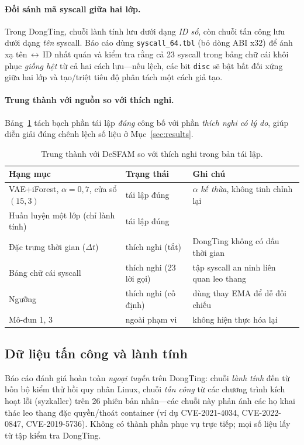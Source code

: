 \paragraph{Đối sánh mã syscall giữa hai lớp.} Trong DongTing, chuỗi lành tính lưu
dưới dạng \emph{ID số}, còn chuỗi tấn công lưu dưới dạng \emph{tên} syscall. Báo cáo
dùng \texttt{syscall\_64.tbl} (bỏ dòng ABI x32) để ánh xạ tên\,$\leftrightarrow$\,ID
nhất quán và kiểm tra rằng cả 23 syscall trong bảng chữ cái khôi phục \emph{giống
hệt} từ cả hai cách lưu---nếu lệch, các bit \texttt{disc} sẽ bật bất đối xứng giữa
hai lớp và tạo/triệt tiêu độ phân tách một cách giả tạo.

\paragraph{Trung thành với nguồn so với thích nghi.} Bảng~\ref{tab:fidelity} tách
bạch phần tái lập \emph{đúng} công bố với phần \emph{thích nghi có lý do}, giúp diễn
giải đúng chênh lệch số liệu ở Mục~\ref{sec:results}.

\begin{table}[htbp]
  \centering
  \caption{Trung thành với DeSFAM so với thích nghi trong bản tái lập.}
  \label{tab:fidelity}
  \small
  \begin{tabularx}{\linewidth}{@{}>{\raggedright\arraybackslash}p{4.6cm} l >{\raggedright\arraybackslash}X@{}}
    \toprule
    \textbf{Hạng mục} & \textbf{Trạng thái} & \textbf{Ghi chú} \\
    \midrule
    VAE+iForest, $\alpha=0{,}7$, cửa sổ $(15,3)$ & tái lập đúng & $\alpha$ \emph{kế thừa}, không tinh chỉnh lại \\
    Huấn luyện một lớp (chỉ lành tính)           & tái lập đúng & \\
    Đặc trưng thời gian ($\Delta t$)             & thích nghi (tắt) & DongTing không có dấu thời gian \\
    Bảng chữ cái syscall                         & thích nghi (23 lời gọi) & tập syscall an ninh liên quan leo thang \\
    Ngưỡng                                       & thích nghi (cố định) & dùng thay EMA để dễ đối chiếu \\
    Mô-đun 1, 3                                  & ngoài phạm vi & không hiện thực hóa lại \\
    \bottomrule
  \end{tabularx}
\end{table}

\subsection{Dữ liệu tấn công và lành tính}
Báo cáo đánh giá hoàn toàn \emph{ngoại tuyến} trên DongTing: chuỗi \emph{lành tính}
đến từ bốn bộ kiểm thử hồi quy nhân Linux, chuỗi \emph{tấn công} từ các chương trình
kích hoạt lỗi (syzkaller) trên 26 phiên bản nhân---các chuỗi này phản ánh các họ
khai thác leo thang đặc quyền/thoát container (ví dụ CVE-2021-4034, CVE-2022-0847,
CVE-2019-5736). Không có thành phần phục vụ trực tiếp; mọi số liệu lấy từ tập kiểm
tra DongTing.
